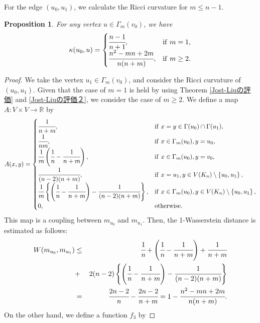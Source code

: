 \documentclass[leqno,12pt]{amsart} %
\theoremstyle{plain} %
\newtheorem{proposition}[theorem]{\indent\sc Proposition}
\theoremstyle{definition} %
\begin{document}
For the edge $(u_0, u_1)$, we calculate the Ricci curvature for $m \leq n-1$.
\begin{proposition}
\label{３番目}
For any vertex $u \in \Gamma_m (v_0)$, we have
\begin{eqnarray*}
\kappa(u_0, u) = 
\begin{cases}
\cfrac{n-1}{n+1}, & \mathrm{if}\ m=1,\\
\cfrac{n^{2} - mn + 2m}{n (n+m)}, & \mathrm{if}\ m \geq 2.
\end{cases}
\end{eqnarray*}
\end{proposition}
\begin{proof}
We take the vertex $u_1 \in \Gamma_m (v_0)$, and consider the Ricci curvature of $(u_0, u_1)$. 
Given that the case of $m=1$ is held by using Theorem \ref{Jost-Liuの評価} and \ref{Jost-Liuの評価２}, we consider the case of $m \geq 2$. We define a map $A : V \times V \to \mathbb{R}$ by
\begin{eqnarray*}
A (x, y)=
\begin{cases}
\cfrac{1}{n+m}, & \mathrm{if}\ x=y \in \Gamma(u_0)\cap \Gamma(u_1),\\
\cfrac{1}{nm}, & \mathrm{if}\ x \in \Gamma_m (u_0), y=u_0,\\
\cfrac{1}{m} \left( \cfrac{1}{n} - \cfrac{1}{n+m} \right), & \mathrm{if}\ x \in \Gamma_m (u_0), y=v_0,\\
\cfrac{1}{(n-2)(n+m)}, & \mathrm{if}\ x=u_1, y \in V(K_n) \setminus \left\{ u_0, u_1 \right\},\\
\cfrac{1}{m} \left\{ \left( \cfrac{1}{n} - \cfrac{1}{n+m} \right) - \cfrac{1}{(n-2)(n+m)} \right\}, & \mathrm{if}\ x \in \Gamma_m (u_0), y \in V(K_n) \setminus \left\{ u_0, u_1 \right\}, \\
0, & \mathrm{otherwise}.
\end{cases}
\end{eqnarray*}
This map is a coupling between $m_{u_0}$ and $m_{u_1}$. Then, the 1-Wasserstein distance is estimated as follows:
\begin{eqnarray*}
W(m_{u_0}, m_{u_1}) &\leq& \cfrac{1}{n} + \left( \cfrac{1}{n} - \cfrac{1}{n+m} \right) + \cfrac{1}{n+m} \\
&+& 2(n-2)  \left\{ \left( \cfrac{1}{n} - \cfrac{1}{n+m} \right) - \cfrac{1}{(n-2)(n+m)} \right\}\\
&=& \cfrac{2n-2}{n} -\cfrac{2n-2}{n+m} = 1 - \cfrac{n^{2} - mn + 2m}{n (n+m)} .
\end{eqnarray*}
On the other hand, we define a function $f_3$ by

\end{proof}
\end{document}
